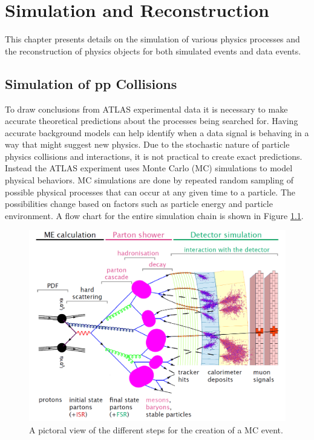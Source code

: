 \chapter{Simulation and Reconstruction}
\label{ch:Simulation}


This chapter presents details on the simulation of various physics processes and the reconstruction of physics objects for both simulated events and data events.  

\section{Simulation of pp Collisions}
To draw conclusions from ATLAS experimental data it is necessary to make accurate theoretical predictions about the processes being searched for.  Having accurate background models can help identify when a data signal is behaving in a way that might suggest new physics.  Due to the stochastic nature of particle physics collisions and interactions, it is not practical to create exact predictions.  Instead the ATLAS experiment uses Monte Carlo (MC) simulations to model physical behaviors.  MC simulations are done by repeated random sampling of possible physical processes that can occur at any given time to a particle.  The possibilities change based on factors such as particle energy and particle environment.  A flow chart for the entire simulation chain is shown in Figure \ref{fig:SimMCFlow}. 

\begin{figure}[h!]
	\centering
	\includegraphics[width=\columnwidth]{../ThesisImages/Simulation/MCFlow.png}
	\caption[A pictoral view of the different steps for the creation of a MC event.]{A pictoral view of the different steps for the creation of a MC event. \cite{MaxThesis} 
	}
	\label{fig:SimMCFlow}
\end{figure}

